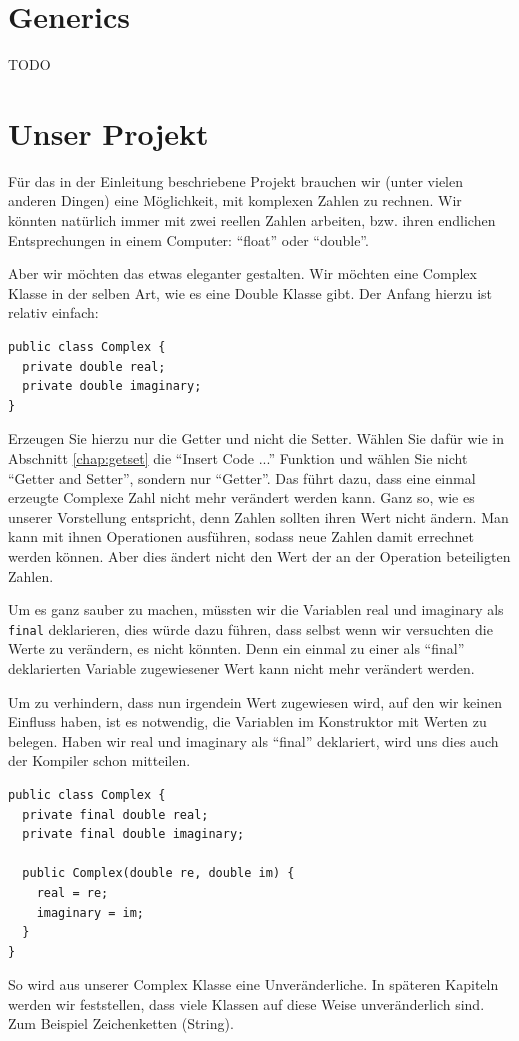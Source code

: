 \section{Generics}
TODO

\section{Unser Projekt}

Für das in der Einleitung beschriebene Projekt brauchen wir (unter vielen anderen Dingen) eine Möglichkeit, mit komplexen Zahlen zu rechnen. Wir könnten natürlich immer mit zwei reellen Zahlen arbeiten, bzw. ihren endlichen Entsprechungen in einem Computer: "`float"' oder "`double"'. 

Aber wir möchten das etwas eleganter gestalten. Wir möchten eine Complex Klasse in der selben Art, wie es eine Double Klasse gibt. Der Anfang hierzu ist relativ einfach: 
\begin{lstlisting}
public class Complex {
  private double real;
  private double imaginary;
}
\end{lstlisting}
Erzeugen Sie hierzu nur die Getter und nicht die Setter. Wählen Sie dafür wie in Abschnitt \ref{chap:getset} die "`Insert Code ..."' Funktion und wählen Sie nicht "`Getter and Setter"', sondern nur "`Getter"'. Das führt dazu, dass eine einmal erzeugte Complexe Zahl nicht mehr verändert werden kann. Ganz so, wie es unserer Vorstellung entspricht, denn Zahlen sollten ihren Wert nicht ändern. Man kann mit ihnen Operationen ausführen, sodass neue Zahlen damit errechnet werden können. Aber dies ändert nicht den Wert der an der Operation beteiligten Zahlen. 

Um es ganz sauber zu machen, müssten wir die Variablen real und imaginary als \texttt{final} deklarieren, dies würde dazu führen, dass selbst wenn wir versuchten die Werte zu verändern, es nicht könnten. Denn ein einmal zu einer als "`final"' deklarierten Variable zugewiesener Wert kann nicht mehr verändert werden.

Um zu verhindern, dass nun irgendein Wert zugewiesen wird, auf den wir keinen Einfluss haben, ist es notwendig, die Variablen im Konstruktor mit Werten zu belegen. Haben wir real und imaginary als "`final"' deklariert, wird uns dies auch der Kompiler schon mitteilen. 
\begin{lstlisting}
public class Complex {
  private final double real;
  private final double imaginary;
  
  public Complex(double re, double im) {
    real = re;
    imaginary = im;
  }
}
\end{lstlisting}
So wird aus unserer Complex Klasse eine Unveränderliche. In späteren Kapiteln werden wir feststellen, dass viele Klassen auf diese Weise unveränderlich sind. Zum Beispiel Zeichenketten (String).

